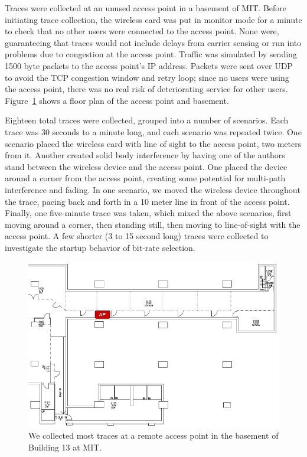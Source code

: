 \documentclass[twocolumn,10pt]{article}
\begin{document}
Traces were collected at an unused access point in a basement of MIT.
Before initiating trace collection, the wireless card was put in
monitor mode for a minute to check that no other users were connected
to the access point.  None were, guaranteeing that traces would not
include delays from carrier sensing or run into problems due to
congestion at the access point.  Traffic was simulated by sending 1500
byte packets to the access point's IP address.  Packets were sent over
UDP to avoid the TCP congestion window and retry loop; since no users
were using the access point, there was no real risk of deteriorating
service for other users.  Figure~\ref{figure:1} shows a floor plan of
the access point and basement.

Eighteen total traces were collected, grouped into a number of
scenarios.  Each trace was 30 seconds to a minute long, and each
scenario was repeated twice.  One scenario placed the wireless card
with line of sight to the access point, two meters from it.  Another
created solid body interference by having one of the authors stand
between the wireless device and the access point.  One placed the
device around a corner from the access point, creating some potential
for multi-path interference and fading.  In one scenario, we moved the
wireless device throughout the trace, pacing back and forth in a 10
meter line in front of the access point.  Finally, one five-minute
trace was taken, which mixed the above scenarios, first moving around
a corner, then standing still, then moving to line-of-sight with the
access point.  A few shorter (3 to 15 second long) traces were
collected to investigate the startup behavior of bit-rate selection.

\begin{figure}[htbp]
  \centering
  \includegraphics[width=\linewidth]{bsmt13floorplan.png}
  \caption{We collected most traces at a remote access point in the basement of Building 13 at MIT.}
\label{figure:1}
\end{figure}
\end{document}

